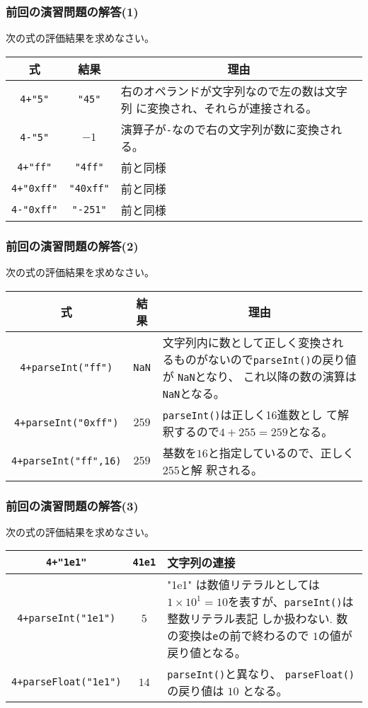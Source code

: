   \newcommand{\Rule}{\iffalse\rule[-2ex]{0em}{5ex}\fi}
\begin{frame}[containsverbatim]
\frametitle{前回の演習問題の解答(1)}
次の式の評価結果を求めなさい。
\begin{center}
 \begin{tabular}{|>{\Rule}c|c|m{}|}\hline
  \multicolumn{1}{|c|}{式}&\multicolumn{1}{c|}{結果} &\multicolumn{1}{c|}{理由} \\\hline
  \Verb-4+"5"-& \Verb+"45"+& 右のオペランドが文字列なので左の数は文字列
    に変換され、それらが連接される。\\ \hline
  \Verb+4-"5"+& $-1$& 演算子が\Verb+-+なので右の文字列が数に変換される。\\ \hline
  \Verb-4+"ff"-&\Verb+"4ff"+ & 前と同様\\ \hline
  \Verb-4+"0xff"-& \Verb+"40xff"+& 前と同様\\ \hline
  \Verb+4-"0xff"+& \Verb+"-251"+& 前と同様\\ \hline
 \end{tabular}
\end{center}
\end{frame}
\begin{frame}[containsverbatim]
\frametitle{前回の演習問題の解答(2)}
次の式の評価結果を求めなさい。
\begin{center}
 \begin{tabular}{|>{\Rule}c|c|m{}|}\hline
  \multicolumn{1}{|c|}{式}&\multicolumn{1}{c|}{結果} &\multicolumn{1}{c|}{理由} \\\hline
  \Verb-4+parseInt("ff")-& \Verb+NaN+& 文字列内に数として正しく変換され
    るものがないので\Verb+parseInt()+の戻り値が \Verb-NaN-となり、
    これ以降の数の演算は\Verb+NaN+となる。\\ \hline
  \Verb-4+parseInt("0xff")-& $259$& \Verb+parseInt()+は正しく16進数とし
    て解釈するので$4+255=259$となる。\\ \hline
  \Verb-4+parseInt("ff",16)-& $259$& 基数を$16$と指定しているので、正しく$255$と解
    釈される。\\ \hline
 \end{tabular}
\end{center}
\end{frame}
\begin{frame}[containsverbatim]
\frametitle{前回の演習問題の解答(3)}
次の式の評価結果を求めなさい。
\begin{center}
 \begin{tabular}{|>{\Rule}c|c|m{}|}\hline
  \Verb-4+"1e1"-& \Verb+41e1+ & 文字列の連接\\\hline
  \Verb-4+parseInt("1e1")-& $5$ & "1e1" は数値リテラルとしては
    $1\times10^1=10$を表すが、\Verb+parseInt()+は整数リテラル表記
          しか扱わない.
          数の変換は\Verb+e+の前で終わるので $1$の値が
    戻り値となる。 \\ \hline
  \Verb-4+parseFloat("1e1")-& $14$& \Verb+parseInt()+と異なり、
    \Verb+parseFloat()+の戻り値は $10$ となる。\\ \hline
 \end{tabular}
\end{center}
\end{frame}
